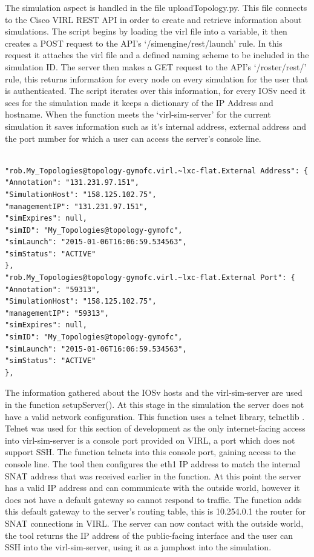 \documentclass[11pt]{report}
\begin{document}
The simulation aspect is handled in the file uploadTopology.py. This file connects to the Cisco VIRL REST API in order to create and retrieve information about simulations. The script begins by loading the virl file into a variable, it then creates a POST request to the API's `/simengine/rest/launch' rule. In this request it attaches the virl file and a defined naming scheme to be included in the simulation ID. The server then makes a GET request to the API's `/roster/rest/' rule, this returns information for every node on every simulation for the user that is authenticated. The script iterates over this information, for every IOSv need it sees for the simulation made it keeps a dictionary of the IP Address and hostname. When the function meets the `virl-sim-server' for the current simulation it saves information such as it's internal address, external address and the port number for which a user can access the server's console line.

\begin{lstlisting}[caption=Extract of /roster/rest information]

"rob.My_Topologies@topology-gymofc.virl.~lxc-flat.External Address": {
"Annotation": "131.231.97.151",
"SimulationHost": "158.125.102.75",
"managementIP": "131.231.97.151",
"simExpires": null,
"simID": "My_Topologies@topology-gymofc",
"simLaunch": "2015-01-06T16:06:59.534563",
"simStatus": "ACTIVE"
},
"rob.My_Topologies@topology-gymofc.virl.~lxc-flat.External Port": {
"Annotation": "59313",
"SimulationHost": "158.125.102.75",
"managementIP": "59313",
"simExpires": null,
"simID": "My_Topologies@topology-gymofc",
"simLaunch": "2015-01-06T16:06:59.534563",
"simStatus": "ACTIVE"
},

\end{lstlisting}

The information gathered about the IOSv hosts and the virl-sim-server are used in the function setupServer(). At this stage in the simulation the server does not have a valid network configuration. This function uses a telnet library, telnetlib \citep{telnetlib}. Telnet was used for this section of development as the only internet-facing access into virl-sim-server is a console port provided on VIRL, a port which does not support SSH. The function telnets into this console port, gaining access to the console line. The tool then configures the eth1 IP address to match the internal SNAT address that was received earlier in the function. At this point the server has a valid IP address and can communicate with the outside world, however it does not have a default gateway so cannot respond to traffic. The function adds this default gateway to the server's routing table, this is 10.254.0.1 the router for SNAT connections in VIRL. The server can now contact with the outside world, the tool returns the IP address of the public-facing interface and the user can SSH into the virl-sim-server, using it as a jumphost into the simulation.
\end{document}

